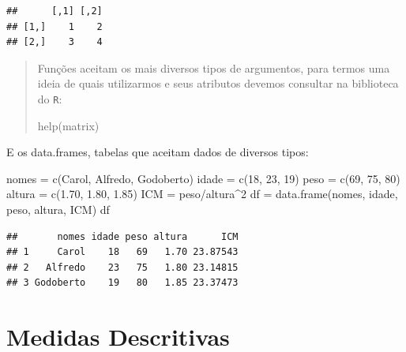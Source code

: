 \documentclass[
]{book}
\newenvironment{Shaded}{\begin{snugshade}}{\end{snugshade}}
\newcommand{\DecValTok}[1]{\textcolor[rgb]{0.00,0.00,0.81}{#1}}
\newcommand{\FloatTok}[1]{\textcolor[rgb]{0.00,0.00,0.81}{#1}}
\newcommand{\FunctionTok}[1]{\textcolor[rgb]{0.00,0.00,0.00}{#1}}
\newcommand{\NormalTok}[1]{#1}
\newcommand{\OtherTok}[1]{\textcolor[rgb]{0.56,0.35,0.01}{#1}}
\newcommand{\SpecialCharTok}[1]{\textcolor[rgb]{0.00,0.00,0.00}{#1}}
\newcommand{\StringTok}[1]{\textcolor[rgb]{0.31,0.60,0.02}{#1}}
\begin{document}
\begin{verbatim}
##      [,1] [,2]
## [1,]    1    2
## [2,]    3    4
\end{verbatim}

\begin{quote}
Funções aceitam os mais diversos tipos de argumentos, para termos uma ideia de quais utilizarmos e seus atributos devemos consultar na biblioteca do \texttt{R}:

\begin{Shaded}
\begin{Highlighting}[]
\FunctionTok{help}\NormalTok{(matrix)}
\end{Highlighting}
\end{Shaded}
\end{quote}

E os data.frames, tabelas que aceitam dados de diversos tipos:

\begin{Shaded}
\begin{Highlighting}[]
\NormalTok{nomes }\OtherTok{=} \FunctionTok{c}\NormalTok{(}\StringTok{\textquotesingle{}Carol\textquotesingle{}}\NormalTok{, }\StringTok{\textquotesingle{}Alfredo\textquotesingle{}}\NormalTok{, }\StringTok{\textquotesingle{}Godoberto\textquotesingle{}}\NormalTok{)}
\NormalTok{idade }\OtherTok{=} \FunctionTok{c}\NormalTok{(}\DecValTok{18}\NormalTok{, }\DecValTok{23}\NormalTok{, }\DecValTok{19}\NormalTok{)}
\NormalTok{peso }\OtherTok{=} \FunctionTok{c}\NormalTok{(}\DecValTok{69}\NormalTok{, }\DecValTok{75}\NormalTok{, }\DecValTok{80}\NormalTok{)}
\NormalTok{altura }\OtherTok{=} \FunctionTok{c}\NormalTok{(}\FloatTok{1.70}\NormalTok{, }\FloatTok{1.80}\NormalTok{, }\FloatTok{1.85}\NormalTok{)}
\NormalTok{ICM }\OtherTok{=}\NormalTok{ peso}\SpecialCharTok{/}\NormalTok{altura}\SpecialCharTok{\^{}}\DecValTok{2}
\NormalTok{df }\OtherTok{=} \FunctionTok{data.frame}\NormalTok{(nomes, idade, peso, altura, ICM)}
\NormalTok{df}
\end{Highlighting}
\end{Shaded}

\begin{verbatim}
##       nomes idade peso altura      ICM
## 1     Carol    18   69   1.70 23.87543
## 2   Alfredo    23   75   1.80 23.14815
## 3 Godoberto    19   80   1.85 23.37473
\end{verbatim}

\hypertarget{medidas-descritivas}{%
\chapter{Medidas Descritivas}\label{medidas-descritivas}}
\end{document}
